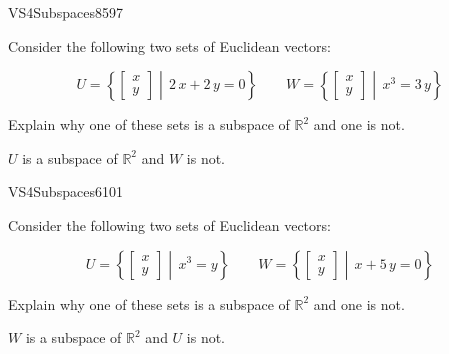 \begin{exercise}{VS4}{Subspaces}{8597} 
\begin{exerciseStatement} 

Consider the following two sets of Euclidean vectors: 

 \[
          U=\left\{ \left[\begin{array}{c}
x \\
y
\end{array}\right] \middle|\,2 \, x + 2 \, y = 0\right\} \hspace{2em}  W=\left\{ \left[\begin{array}{c}
x \\
y
\end{array}\right] \middle|\,x^{3} = 3 \, y\right\}
    \] 

 Explain why one of these sets is a subspace of \(\mathbb{R}^2\) and one is not. 

 \end{exerciseStatement}
 \begin{exerciseAnswer} 

\(U\) is a subspace of \(\mathbb{R}^2\) and \(W\) is not.

 \end{exerciseAnswer}
 \end{exercise}


\begin{exercise}{VS4}{Subspaces}{6101} 
\begin{exerciseStatement} 

Consider the following two sets of Euclidean vectors: 

 \[
          U=\left\{ \left[\begin{array}{c}
x \\
y
\end{array}\right] \middle|\,x^{3} = y\right\} \hspace{2em}  W=\left\{ \left[\begin{array}{c}
x \\
y
\end{array}\right] \middle|\,x + 5 \, y = 0\right\}
    \] 

 Explain why one of these sets is a subspace of \(\mathbb{R}^2\) and one is not. 

 \end{exerciseStatement}
 \begin{exerciseAnswer} 

\(W\) is a subspace of \(\mathbb{R}^2\) and \(U\) is not.

 \end{exerciseAnswer}
 \end{exercise}


